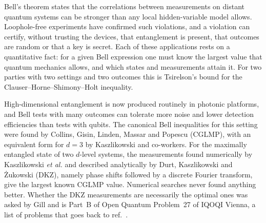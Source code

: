 \documentclass[11pt]{article}
\begin{document}
\noindent Bell's theorem states that the correlations between measurements on distant quantum systems can be stronger
than any local hidden-variable model allows\cite{Bell1964,CHSH1969,Brunner2014}. Loophole-free experiments have
confirmed such violations\cite{Hensen2015,Giustina2015,Shalm2015}, and a violation can certify, without trusting the
devices, that entanglement is present, that outcomes are random or that a key is secret\cite{Acin2007,Pironio2010}.
Each of these applications rests on a quantitative fact: for a given Bell expression one must know the largest value
that quantum mechanics allows, and which states and measurements attain it. For two parties with two settings and two
outcomes this is Tsirelson's bound\cite{Tsirelson1980} for the Clauser--Horne--Shimony--Holt inequality\cite{CHSH1969}.

High-dimensional entanglement is now produced routinely in photonic platforms\cite{Erhard2020,Dada2011}, and Bell tests
with many outcomes can tolerate more noise and lower detection efficiencies than tests with qubits\cite{KGZMZ2000,
CGLMP2002,Vertesi2010}. The canonical Bell inequalities for this setting were found by Collins, Gisin, Linden, Massar
and Popescu (CGLMP)\cite{CGLMP2002}, with an equivalent form for $d=3$ by Kaszlikowski and co-workers\cite{KKCZO2002}.
For the maximally entangled state of two $d$-level systems, the measurements found numerically by Kaszlikowski
\textit{et al.}\cite{KGZMZ2000} and described analytically by Durt, Kaszlikowski and \.Zukowski (DKZ)\cite{DKZ2001},
namely phase shifts followed by a discrete Fourier transform, give the largest known CGLMP value. Numerical searches
never found anything better\cite{KGZMZ2000,DKZ2001,CGLMP2002}. Whether the DKZ measurements are necessarily the optimal
ones was asked by Gill\cite{Gill2007} and is Part~B of Open Quantum Problem~27 of IQOQI Vienna\cite{OQP27}, a list of
problems that goes back to ref.~.
\end{document}
